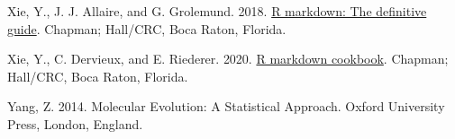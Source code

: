 \documentclass[fleqn,10pt,lineno]{wlpeerj} %
\newlength{\cslhangindent}
\newlength{\cslentryspacingunit} %
\newenvironment{CSLReferences}[2] %
 {%
  \setlength{\parindent}{0pt}
  \ifodd #1
  \let\oldpar\par
  \def\par{\hangindent=\cslhangindent\oldpar}
  \fi
  \setlength{\parskip}{#2\cslentryspacingunit}
 }%
 {}
\begin{document}
\begin{CSLReferences}{1}{0}
\leavevmode{}%
Xie, Y., J. J. Allaire, and G. Grolemund. 2018. \href{https://bookdown.org/yihui/rmarkdown}{R markdown: The definitive guide}. Chapman; Hall/CRC, Boca Raton, Florida.

\leavevmode{}%
Xie, Y., C. Dervieux, and E. Riederer. 2020. \href{https://bookdown.org/yihui/rmarkdown-cookbook}{R markdown cookbook}. Chapman; Hall/CRC, Boca Raton, Florida.

\leavevmode{}%
Yang, Z. 2014. Molecular {E}volution: A {S}tatistical {A}pproach. Oxford University Press, London, England.

\end{CSLReferences}
\end{document}
